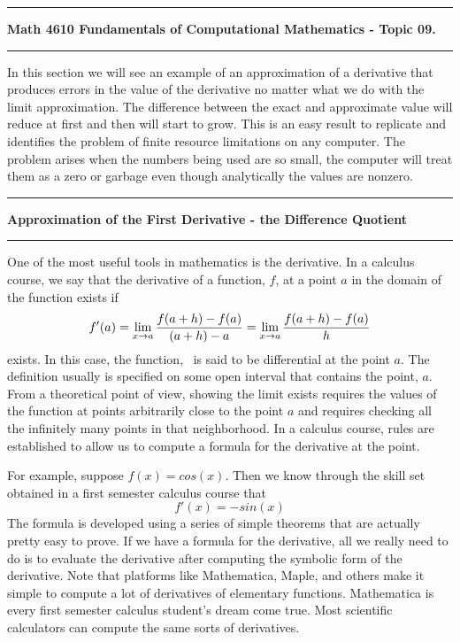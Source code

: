 \documentclass[10pt,fleqn]{article}
\begin{document}
\vskip0.1in\hrule\vskip0.1in \noindent
{\bf Math 4610 Fundamentals of Computational Mathematics  - Topic 09.}
\vskip0.1in\hrule\vskip0.1in \noindent
In this section we will see an example of an approximation of a derivative that
produces errors in the value of the derivative no matter what we do with the
limit approximation. The difference between the exact and approximate value will
reduce at first and then will start to grow. This is an easy result to replicate
and identifies the problem of finite resource limitations on any computer. The
problem arises when the numbers being used are so small, the computer will
treat them as a zero or garbage even though analytically the values are nonzero.
\vskip0.1in\hrule\vskip0.1in\noindent
{\bf Approximation of the First Derivative - the Difference Quotient} 
\vskip0.1in\hrule\vskip0.1in\noindent
One of the most useful tools in mathematics is the derivative. In a calculus
course, we say that the derivative of a function, \(f\), at a point \(a\) in the
domain of the function exists if
\[
  f'(a) = \lim_{x\rightarrow a} {{f(a+h)-f(a)}\over{(a+h)-a}}
        = \lim_{x\rightarrow a} {{f(a+h)-f(a)}\over{h}}
\]
exists. In this case, the function, \ is said to be differential at the point
\(a\). The definition usually is specified on some open interval that contains
the point, \(a\). From a theoretical point of view, showing the limit exists
requires the values of the function at points arbitrarily close to the point
\(a\) and requires checking all the infinitely many points in that neighborhood.
In a calculus course, rules are established to allow us to compute a formula
for the derivative at the point.

For example, suppose \(f(x)=cos(x)\). Then we know through the skill set
obtained in a first semester calculus course that
\[
  f'(x) = -sin(x)
\]
The formula is developed using a series of simple theorems that are actually
pretty easy to prove. If we have a formula for the derivative, all we really
need to do is to evaluate the derivative after computing the symbolic form of
the derivative. Note that platforms like Mathematica, Maple, and others make it
simple to compute a lot of derivatives of elementary functions. Mathematica is
every first semester calculus student's dream come true. Most scientific
calculators can compute the same sorts of derivatives.
\end{document}
